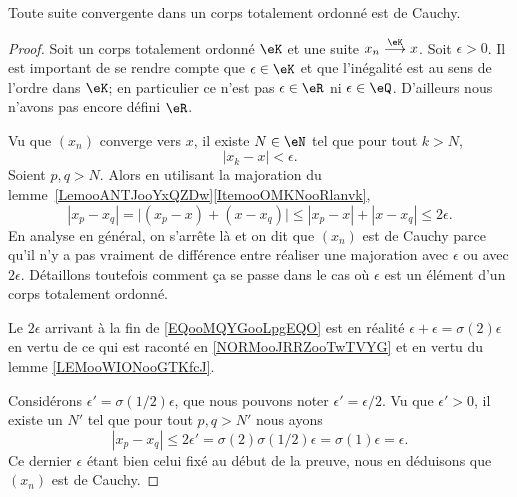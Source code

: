 \begin{proposition}     \label{PROPooTFVOooFoSHPg}
    Toute suite convergente dans un corps totalement ordonné est de Cauchy.
\end{proposition}

\begin{proof}
    Soit un corps totalement ordonné \( \eK\) et une suite \( x_n\stackrel{\eK}{\longrightarrow}x\). Soit \( \epsilon>0\). Il est important de se rendre compte que \( \epsilon\in \eK\) et que l'inégalité est au sens de l'ordre dans \( \eK\); en particulier ce n'est pas \( \epsilon\in \eR\) ni \( \epsilon\in \eQ\). D'ailleurs nous n'avons pas encore défini \( \eR\).

    Vu que \( (x_n)\) converge vers \( x\), il existe \( N\in \eN\) tel que pour tout \( k>N\),
    \begin{equation}
        | x_k-x |<\epsilon.
    \end{equation}
    Soient \( p,q>N\). Alors en utilisant la majoration du lemme~\ref{LemooANTJooYxQZDw}\ref{ItemooOMKNooRlanvk},
    \begin{equation}        \label{EQooMQYGooLpgEQO}
        | x_p-x_q |=\big| (x_p-x)+(x-x_q) \big|\leq | x_p-x |+| x-x_q |\leq 2\epsilon.
    \end{equation}
    En analyse en général, on s'arrête là et on dit que \( (x_n)\) est de Cauchy parce qu'il n'y a pas vraiment de différence entre réaliser une majoration avec \( \epsilon\) ou avec \( 2\epsilon\). Détaillons toutefois comment ça se passe dans le cas où \( \epsilon\) est un élément d'un corps totalement ordonné.

    Le \( 2\epsilon\) arrivant à la fin de \eqref{EQooMQYGooLpgEQO} est en réalité \( \epsilon+\epsilon=\sigma(2)\epsilon\) en vertu de ce qui est raconté en \ref{NORMooJRRZooTwTVYG} et en vertu du lemme \ref{LEMooWIONooGTKfcJ}.

    Considérons \( \epsilon'=\sigma(1/2)\epsilon\), que nous pouvons noter \( \epsilon'=\epsilon/2\). Vu que \( \epsilon'>0\), il existe un \( N'\) tel que pour tout \( p,q>N'\) nous ayons
    \begin{equation}
        | x_p-x_q |\leq 2\epsilon'=\sigma(2)\sigma(1/2)\epsilon=\sigma(1)\epsilon=\epsilon.
    \end{equation}
    Ce dernier \( \epsilon\) étant bien celui fixé au début de la preuve, nous en déduisons que \( (x_n)\) est de Cauchy.
\end{proof}

